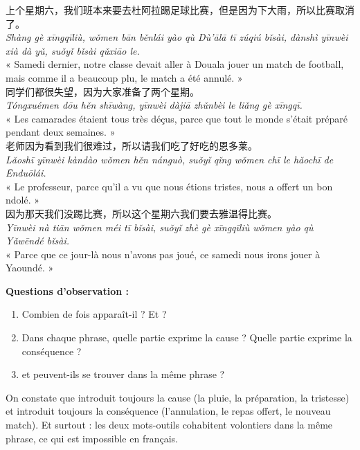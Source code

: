 \documentclass[11pt]{article}
\newcommand{\cle}[1]{{\popxbold\color{popdark}#1}}
\newcommand{\zh}[1]{\ifmmode\text{#1}\else{#1}\fi}
\begin{document}
\begin{textebox}
上个星期六，我们班本来要去杜阿拉踢足球比赛，但是因为下大雨，所以比赛取消了。\\
\emph{Shàng gè xīngqīliù, wǒmen bān běnlái yào qù Dù'ālā tī zúqiú bǐsài, dànshì yīnwèi xià dà yǔ, suǒyǐ bǐsài qǔxiāo le.}\\
« Samedi dernier, notre classe devait aller à Douala jouer un match de football, mais comme il a beaucoup plu, le match a été annulé. »\\[4pt]
同学们都很失望，因为大家准备了两个星期。\\
\emph{Tóngxuémen dōu hěn shīwàng, yīnwèi dàjiā zhǔnbèi le liǎng gè xīngqī.}\\
« Les camarades étaient tous très déçus, parce que tout le monde s'était préparé pendant deux semaines. »\\[4pt]
老师因为看到我们很难过，所以请我们吃了好吃的恩多莱。\\
\emph{Lǎoshī yīnwèi kàndào wǒmen hěn nánguò, suǒyǐ qǐng wǒmen chī le hǎochī de Ēnduōlái.}\\
« Le professeur, parce qu'il a vu que nous étions tristes, nous a offert un bon ndolé. »\\[4pt]
因为那天我们没踢比赛，所以这个星期六我们要去雅温得比赛。\\
\emph{Yīnwèi nà tiān wǒmen méi tī bǐsài, suǒyǐ zhè gè xīngqīliù wǒmen yào qù Yǎwēndé bǐsài.}\\
« Parce que ce jour-là nous n'avons pas joué, ce samedi nous irons jouer à Yaoundé. »
\end{textebox}

\textbf{Questions d'observation :}
\begin{enumerate}
\item Combien de fois \zh{因为} apparaît-il ? Et \zh{所以} ?
\item Dans chaque phrase, quelle partie exprime la cause ? Quelle partie exprime la conséquence ?
\item \zh{因为} et \zh{所以} peuvent-ils se trouver dans la même phrase ?
\end{enumerate}

On constate que \zh{因为} introduit toujours la \cle{cause} (la pluie, la préparation, la tristesse) et \zh{所以} introduit toujours la \cle{conséquence} (l'annulation, le repas offert, le nouveau match). Et surtout : les deux mots-outils cohabitent volontiers dans la même phrase, ce qui est impossible en français.
\end{document}
